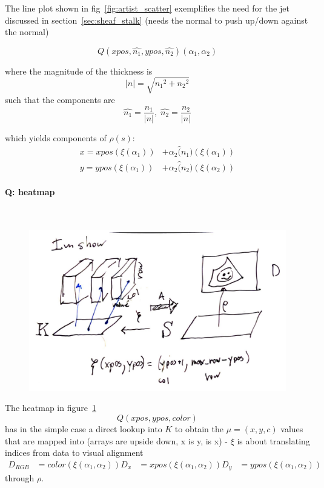 \documentclass[../main.tex]{subfiles}
\begin{document}
The line plot shown in fig~\ref{fig:artist_scatter} exemplifies the need for the jet discussed in section~\ref{sec:sheaf_stalk}
(needs the normal to push up/down against the normal)

\begin{equation}
    Q(xpos, \hat{n_{1}}, ypos, \hat{n_{2}})(\alpha_1, \alpha_2)
\end{equation}

where the magnitude of the thickness is 
\begin{equation}
    \lvert n \rvert = \sqrt{{n_{1}}^2 + {n_{2}}^2}
\end{equation}
such that the components are 
\begin{equation}
    \hat{n_{1}} = \frac{n_1}{\lvert n \rvert}, \; \hat{n_{2}} = \frac{n_2}{\lvert n \rvert}
\end{equation}
    
which yields components of $\rho(s)$:
\begin{align}
 x = xpos(\xi(\alpha_1)) &+ \alpha_2\hat(n_1)(\xi(\alpha_1)) \\
 y = ypos(\xi(\alpha_1)) &+ \alpha_2\hat(n_2)(\xi(\alpha_2)) 
\end{align}


\paragraph{Q: heatmap}\mbox{} \\
\label{sec:artist_example_heatmap}
\begin{figure}[ht!]
    \includegraphics[width=\textwidth]{figures/math/heatmap.png}
    \label{fig:artist_heatmap}
\end{figure}
The heatmap in figure~\ref{fig:artist_heatmap} 
\begin{equation}
Q(xpos, ypos, color)
\end{equation}
has in the simple case a direct lookup into $K$ to obtain the $\mu = (x,y,c)$ values that are mapped into 
(arrays are upside down, x is y, is x) - $\xi$ is about translating indices from data to visual alignment
\begin{align}
D_{RGB} &= color(\xi(\alpha_1, \alpha_2))
D_x & = xpos(\xi(\alpha_1, \alpha_2))
D_y &= ypos(\xi(\alpha_1, \alpha_2))
\end{align}
through $\rho$. 
\end{document}

